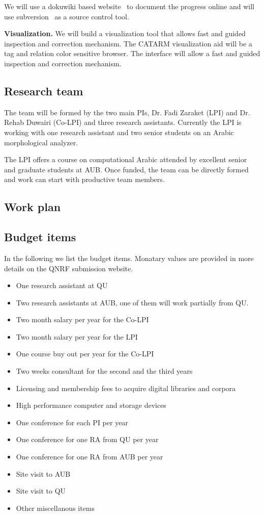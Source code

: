 \documentclass[12pt]{article}
\begin{document}
We will use a dokuwiki based website~\cite{Dok09} 
to document the progress online and will use 
subversion~\cite{Sub09} as a source control tool.
 
{\bf Visualization.} 
We will build a visualization tool that allows fast 
and guided inspection and correction mechanism. 
The CATARM visualization aid will be a tag and relation color
sensitive browser.
The interface will allow a fast and guided inspection and 
correction mechanism.

\subsection{Research team}

The team will be formed by the two main PIs, Dr. Fadi Zaraket (LPI)
and Dr. Rehab Duwairi (Co-LPI) and three research assistants.
Currently the LPI is working with one research assistant 
and two senior students on an Arabic morphological analyzer. 

The LPI offers a course on computational Arabic attended
by excellent senior and graduate students at AUB. 
Once funded, the team can be directly formed and work can start
with productive team members. 

\subsection{Work plan}

\subsection{Budget items}

In the following we list the budget items. 
Monatary values are provided in more details on the QNRF submission 
website. 

\begin{itemize}
\item One research assistant at QU
\item Two research assistants at AUB, one of them will 
work partially from QU. 
\item Two month salary per year for the Co-LPI
\item Two month salary per year for the LPI
\item One course buy out per year for the Co-LPI
\item Two weeks consultant for the second and the third years
\item Licensing and membership fees to acquire digital libraries and corpora
\item High performance computer and storage devices
\item One conference for each PI per year
\item One conference for one RA from QU per year
\item One conference for one RA from AUB per year
\item Site visit to AUB 
\item Site visit to QU 
\item Other miscellanous items
\end{itemize}
\end{document}
